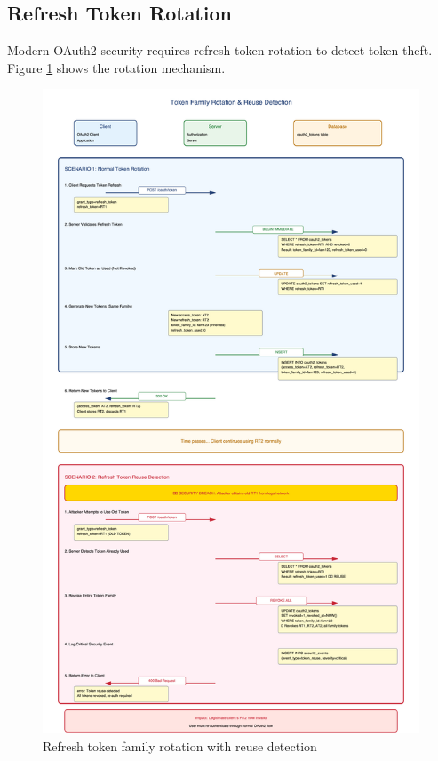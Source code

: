\documentclass[12pt,a4paper]{article}
\begin{document}
\subsection{Refresh Token Rotation}

Modern OAuth2 security requires refresh token rotation to detect token theft. Figure \ref{fig:token_rotation} shows the rotation mechanism.

\begin{figure}[H]
    \centering
    \includegraphics[width=\textwidth,height=0.85\textheight,keepaspectratio]{diagrams/14_token_family_rotation.png}
    \caption{Refresh token family rotation with reuse detection}
    \label{fig:token_rotation}
\end{figure}
\end{document}
